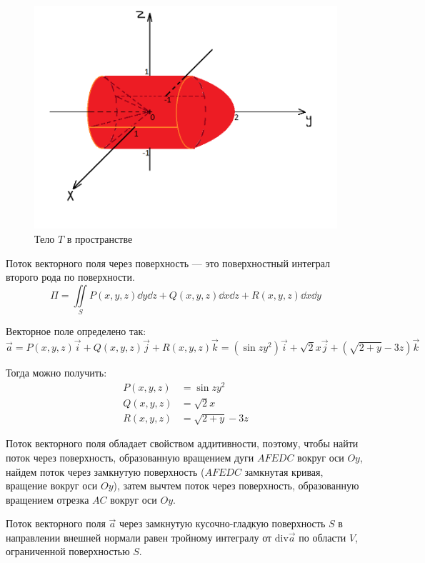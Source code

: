 \begin{figure}[!htbp]
  \centering
  \includegraphics[scale = 0.5]{images/Math_RW4_task3.png}
  \caption{Тело \(T\) в пространстве}
\end{figure}

Поток векторного поля через поверхность ---
это поверхностный интеграл второго рода по поверхности.
\[
  \Pi =
  \iint\limits_{S} P(x,y,z) \dd y \dd z
  + Q(x,y,z) \dd x \dd z
  + R(x,y,z) \dd x \dd y
\]

Векторное поле определено так:
\[
  \vec{a}
  = P(x,y,z)\vec{i} + Q(x,y,z)\vec{j} + R(x,y,z)\vec{k}
  = (\sin{zy^2})\vec{i} + \sqrt{2}x\vec{j} + (\sqrt{2+y}-3z)\vec{k}
\]

Тогда можно получить:
\begin{align*}
  P(x,y,z) &= \sin{z y^2} \\
  Q(x,y,z) &= \sqrt{2}x \\
  R(x,y,z) &= \sqrt{2 + y} - 3z
\end{align*}

Поток векторного поля обладает свойством аддитивности,
поэтому, чтобы найти поток через поверхность,
образованную вращением дуги \(AFEDC\) вокруг оси \(Oy\),
найдем поток через замкнутую поверхность
(\(AFEDC\) замкнутая кривая, вращение вокруг оси \(Oy\)),
затем вычтем поток через поверхность,
образованную вращением отрезка \(AC\) вокруг оси \(Oy\).

\begin{theorem}
Поток векторного поля \(\vec{a}\) через
замкнутую кусочно-гладкую поверхность \(S\)
в направлении внешней нормали равен тройному интегралу от
\(\mathrm{div} \vec{a}\) по области \(V\),
ограниченной поверхностью \(S\).
\end{theorem}

